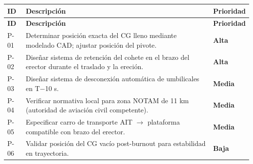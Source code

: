 \documentclass[11pt, a4paper]{article}
\begin{document}
\begin{longtable}{C{1cm} L{8cm} C{2.2cm}}
  \color{white}\textbf{ID} &
  \color{white}\textbf{Descripci\'{o}n} &
  \color{white}\textbf{Prioridad} \\
  \endfirsthead
  \color{white}\textbf{ID} &
  \color{white}\textbf{Descripci\'{o}n} &
  \color{white}\textbf{Prioridad} \\
  \endhead
  P-01 & Determinar posici\'{o}n exacta del CG lleno mediante modelado CAD; ajustar posici\'{o}n del pivote. & \textcolor{tlvred}{\textbf{Alta}} \\
  P-02 & Dise\~{n}ar sistema de retenci\'{o}n del cohete en el brazo del erector durante el traslado y la ereci\'{o}n. & \textcolor{tlvred}{\textbf{Alta}} \\
  P-03 & Dise\~{n}ar sistema de desconexión autom\'{a}tica de umbilicales en T$-$10 s. & \textcolor{tlvorange}{\textbf{Media}} \\
  P-04 & Verificar normativa local para zona NOTAM de 11 km (autoridad de aviaci\'{o}n civil competente). & \textcolor{tlvorange}{\textbf{Media}} \\
  P-05 & Especificar carro de transporte AIT $\rightarrow$ plataforma compatible con brazo del erector. & \textcolor{tlvorange}{\textbf{Media}} \\
  P-06 & Validar posici\'{o}n del CG vac\'{i}o post-burnout para estabilidad en trayectoria. & \textbf{Baja} \\
\end{longtable}
\end{document}
